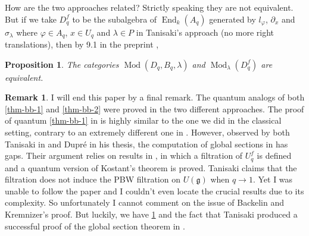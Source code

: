 \documentclass[11pt, a4paper]{article}
\newtheorem{proposition}[theorem]{Proposition}
\theoremstyle{definition}
\newtheorem{remark}[theorem]{Remark}
\newcommand{\s}[0]{\sigma}
\newcommand{\End}[0]{\operatorname{End}}
\newcommand{\Mod}{\operatorname{Mod}}
\newcommand{\g}{\mathfrak g}
\begin{document}
    How are the two approaches related? Strictly speaking they are not equivalent. But if we take $D_q^f$ to be the subalgebra of $\End_k(A_q)$ generated by $l_\varphi$, $\partial_x$ and $\s_\lambda$ where $\varphi\in A_q$, $x\in U_q$ and $\lambda\in P$ in Tanisaki's approach (no more right translations), then by 9.1 in the preprint \cite{tanisaki-comparison},
    \begin{proposition}\label{prop-tanisaki-equiv}
        The categories $\Mod(D_q,B_q,\lambda)$ and $\Mod_\lambda(D^f_{q})$ are equivalent.
    \end{proposition}
    \begin{remark}
        I will end this paper by a final remark. The quantum analogs of both \cref{thm-bb-1} and \cref{thm-bb-2} were proved in the two different approaches. The proof of quantum \cref{thm-bb-1} in \cite{backelin-quantum} is highly similar to the one we did in the classical setting, contrary to an extremely different one in \cite{tanisaki-quantum}. However, observed by both Tanisaki in \cite{tanisaki-root-of-unity-2} and Dupré in his thesis, the computation of global sections in \cite{backelin-quantum} has gaps. Their argument relies on results in \cite{MR1262429}, in which a filtration of $U^f_q$ is defined and a quantum version of Kostant's theorem is proved. Tanisaki claims that the filtration does not induce the PBW filtration on $U(\g)$ when $q\to 1$. Yet I was unable to follow the paper \cite{MR1262429} and I couldn't even locate the crucial results due to its complexity. So unfortunately I cannot comment on the issue of Backelin and Kremnizer's proof. But luckily, we have \cref{prop-tanisaki-equiv} and the fact that Tanisaki produced a successful proof of the global section theorem in \cite{tanisaki-comparison}.
    \end{remark}
    
    \renewcommand{\section}[2]{\vskip 0.01em}
    \printbibliography
\end{document}
